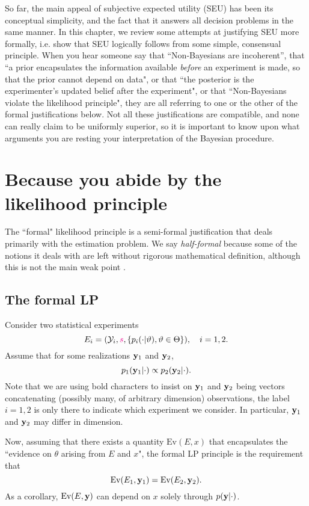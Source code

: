 So far, the main appeal of subjective expected utility (SEU) has been its conceptual simplicity, and the fact that it answers all decision problems in the same manner. 
In this chapter, we review some attempts at justifying SEU more formally, i.e. show that SEU logically follows from some simple, consensual principle.
When you hear someone say that ``Non-Bayesians are incoherent'', that ``a prior encapsulates the information available \emph{before} an experiment is made, so that the prior cannot depend on data", or that ``the posterior is the experimenter's updated belief after the experiment", or that ``Non-Bayesians violate the likelihood principle", they are all referring to one or the other of the formal justifications below. 
Not all these justifications are compatible, and none can really claim to be uniformly superior, so it is important to know upon what arguments you are resting your interpretation of the Bayesian procedure.

\section{Because you abide by the likelihood principle}
The ``formal" likelihood principle \citep{BeWo88} is a semi-formal justification that deals primarily with the estimation problem. 
We say \emph{half-formal} because some of the notions it deals with are left without rigorous mathematical definition, although this is not the main weak point \citep[Discussions]{BeWo88}. 

\subsection{The formal LP}
Consider two statistical experiments
$$
E_i=(\mathcal{Y}_i, \textcolor{magenta}{s}, \{p_i(\cdot\vert\vartheta), \vartheta\in\Theta\}), \quad i=1,2.
$$
Assume that for some realizations $\mathbf{y}_1$ and $\mathbf{y}_2$,
$$
p_1(\mathbf{y}_1\vert\cdot) \propto p_2(\mathbf{y}_2\vert \cdot).
$$
Note that we are using bold characters to insist on $\mathbf{y}_1$ and $\mathbf{y}_2$ being vectors concatenating (possibly many, of arbitrary dimension) observations, the label $i=1,2$ is only there to indicate which experiment we consider.
In particular, $\mathbf{y}_1$ and $\mathbf{y}_2$ may differ in dimension.

Now, assuming that there exists a quantity $\text{Ev}(E,x)$ that encapsulates the ``evidence on $\theta$ arising from $E$ and $x$", the formal LP principle is the requirement that
$$
\text{Ev}(E_1,\mathbf{y}_1) = \text{Ev}(E_2,\mathbf{y}_2).
$$
As a corollary, $\text{Ev}(E,\mathbf{y})$ can depend on $x$ solely through $p(\mathbf{y}\vert\cdot)$.

